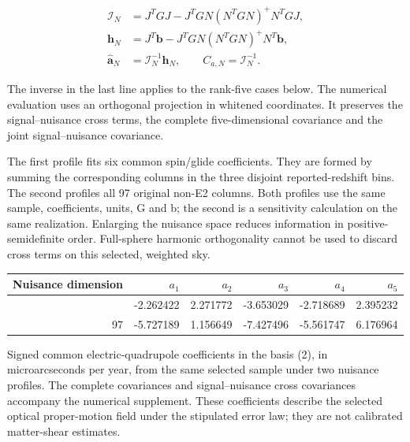 \[
\begin{aligned}
\mathcal I_N&=J^TGJ-J^TGN(N^TGN)^+N^TGJ,\\
\boldsymbol h_N&=J^T\boldsymbol b
-J^TGN(N^TGN)^+N^T\boldsymbol b,\\
\widehat{\boldsymbol a}_N&=\mathcal I_N^{-1}\boldsymbol h_N,
\qquad C_{a,N}=\mathcal I_N^{-1}.
\end{aligned}
\tag{34}
\]

The inverse in the last line applies to the rank-five cases below. The numerical evaluation uses an orthogonal projection in whitened coordinates. It preserves the signal--nuisance cross terms, the complete five-dimensional covariance and the joint signal--nuisance covariance.

The first profile fits six common spin/glide coefficients. They are formed by summing the corresponding columns in the three disjoint reported-redshift bins. The second profiles all 97 original non-E2 columns. Both profiles use the same sample, coefficients, units, G and b; the second is a sensitivity calculation on the same realization. Enlarging the nuisance space reduces information in positive-semidefinite order. Full-sphere harmonic orthogonality cannot be used to discard cross terms on this selected, weighted sky.

\begin{longtable}[]{@{}rrrrrr@{}}
\toprule\noalign{}
Nuisance dimension & \(a_1\) & \(a_2\) & \(a_3\) & \(a_4\) & \(a_5\) \\
\midrule\noalign{}
\endhead
\bottomrule\noalign{}
\endlastfoot
6 & -2.262422 & 2.271772 & -3.653029 & -2.718689 & 2.395232 \\
97 & -5.727189 & 1.156649 & -7.427496 & -5.561747 & 6.176964 \\
\end{longtable}

Signed common electric-quadrupole coefficients in the basis (2), in microarcseconds per year, from the same selected sample under two nuisance profiles. The complete covariances and signal--nuisance cross covariances accompany the numerical supplement. These coefficients describe the selected optical proper-motion field under the stipulated error law; they are not calibrated matter-shear estimates.

